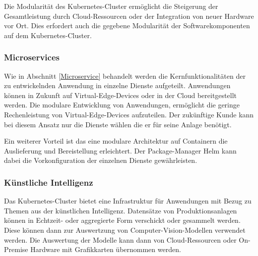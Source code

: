 Die Modularität des Kubernetes-Cluster ermöglicht die Steigerung der Gesamtleistung durch Cloud-Ressourcen oder der Integration von neuer Hardware vor Ort.
Dies erfordert auch die gegebene Modularität der Softwarekomponenten auf dem Kubernetes-Cluster.

\subsubsection{Microservices}
Wie in Abschnitt \ref{Microservice} behandelt werden die Kernfunktionalitäten der zu entwickelnden Anwendung in einzelne Dienste aufgeteilt.
Anwendungen können in Zukunft auf Virtual-Edge-Devices oder in der Cloud bereitgestellt werden.
Die modulare Entwicklung von Anwendungen, ermöglicht die geringe Rechenleistung von Virtual-Edge-Devices aufzuteilen.
Der zukünftige Kunde kann bei diesem Ansatz nur die Dienste wählen die er für seine Anlage benötigt.

Ein weiterer Vorteil ist das eine modulare Architektur auf Containern die Auslieferung und Bereistellung erleichtert.
Der Package-Manager Helm kann dabei die Vorkonfiguration der einzelnen Dienste gewährleisten.


\subsubsection{Künstliche Intelligenz}
Das Kubernetes-Cluster bietet eine Infrastruktur für Anwendungen mit Bezug zu Themen aus der künstlichen Intelligenz.
Datensätze von Produktionsanlagen können in Echtzeit- oder aggregierte Form verschickt oder gesammelt werden.
Diese können dann zur Auswertzung von Computer-Vision-Modellen verwendet werden.
Die Auswertung der Modelle kann dann von Cloud-Ressourcen oder On-Premise Hardware mit Grafikkarten übernommen werden. 



